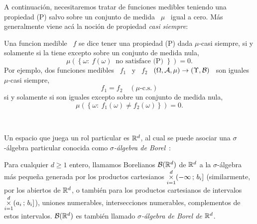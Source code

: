 A  continuaci\'on,  necesitaremos  tratar  de funciones  medibles  teniendo  una
propiedad (P) salvo sobre  un conjunto de medida \ $\mu$ \  igual a cero.  M\'as
generalmente viene ac\'a la noci\'on de propiedad {\it casi siempre}:
%
\begin{definicion}
  Una funcion  medible \  $f$ se  dice tener una  propiedad (P)  dada $\mu$-casi
  siempre, si y solamente si la tiene excepto sobre un conjunto de medida nula,
  \[
  \mu\left( \left\{ \omega:  \: f(\omega) \: \mbox{ no  satisface (P) } \right\}
  \right) = 0.
  \]
  Por ejemplo, dos funciones medibles \ $f_1$ \ y \ $f_2$ \ $(\Omega,\mathcal{A},\mu) \to
  (\Upsilon,\mathcal{B})$ \ son iguales $\mu$-casi siempre,
  \[
  f_1 = f_2 \quad (\mu\mbox{-c.s.})
  \]
  si y solamente si son iguales excepto sobre un conjunto de medida nula,
  \[
  \mu\left( \left\{ \omega: \: f_1(\omega) \ne f_2(\omega) \right\} \right) = 0.
  \]
\end{definicion}

\

Un espacio  que juega un rol particular  es $\mathbb{R}^d$, al cual  se puede asociar
una  $\sigma$-\'algebra  particular  conocida  como {\it  $\sigma$-\'algebra  de
  Borel}~\cite{AthLah06, Bog07:v1, Bog07:v2, Coh13}:
%
\begin{definicion}
  Para  cualquier  $d  \ge  1$  entero,  llamamos  Borelianos  $\mathcal{B}(\mathbb{R}^d)$  de
  $\mathbb{R}^d$ a  la $\sigma$-\'algebra m\'as peque\~na generada  por los productos
  cartesianos   $\displaystyle   \operatorname*{\times}_{i=1}^d  (-\infty   \,   ;  \,   b_i]$
  \big(similarmente,  por  los  abiertos  de  $\mathbb{R}^d$, o  tambi\'en  para  los
  productos cartesianos de intervalos  $\displaystyle \operatorname*{\times}_{i=1}^d (a_i \, ;
  \, b_i]$\big), \ie uniones numerables, intersecciones numerables, complementos
  de    estos   intervalos.    $\mathcal{B}(\mathbb{R}^d)$    es   tambi\'en    llamado   {\it
    $\sigma$-\'algebra de Borel de $\mathbb{R}^d$}.
\end{definicion}

\

